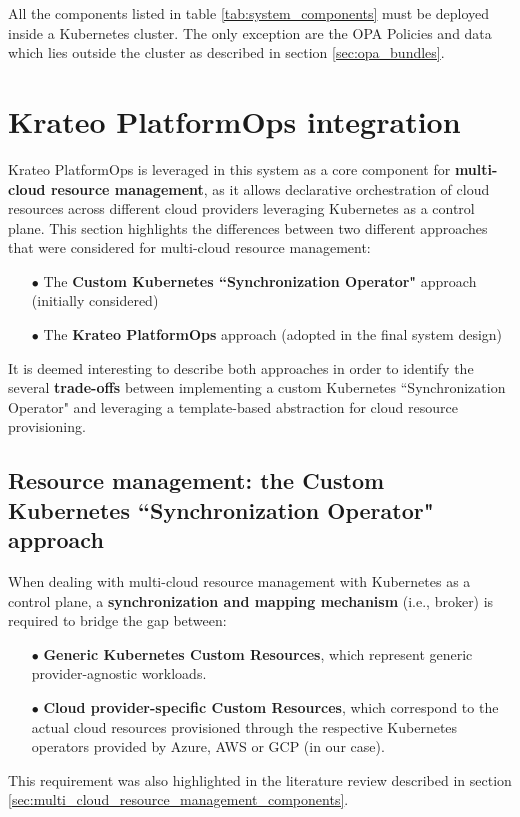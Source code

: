 All the components listed in table \ref{tab:system_components} must be deployed inside a Kubernetes cluster. The only exception are the OPA Policies and data which lies outside the cluster as described in section \ref{sec:opa_bundles}.

\section{Krateo PlatformOps integration}
\label{sec:krateo_integration}

Krateo PlatformOps is leveraged in this system as a core component for \textbf{multi-cloud resource management}, as it allows declarative orchestration of cloud resources across different cloud providers leveraging Kubernetes as a control plane. 
This section highlights the differences between two different approaches that were considered for multi-cloud resource management:
\begin{itemize}[itemsep=0.2pt, topsep=1pt]
  \item[$\bullet$] The \textbf{Custom Kubernetes ``Synchronization Operator"} approach (initially considered)
  \item[$\bullet$] The \textbf{Krateo PlatformOps} approach (adopted in the final system design) \\
\end{itemize}

It is deemed interesting to describe both approaches in order to identify the several \textbf{trade-offs} between implementing a custom Kubernetes ``Synchronization Operator" and leveraging a template-based abstraction for cloud resource provisioning.

\subsection{Resource management: the Custom Kubernetes ``Synchronization Operator" approach}

When dealing with multi-cloud resource management with Kubernetes as a control plane, a \textbf{synchronization and mapping mechanism} (i.e., broker) is required to bridge the gap between:
\begin{itemize}[itemsep=0.2pt, topsep=1pt]
  \item[$\bullet$] \textbf{Generic Kubernetes Custom Resources}, which represent generic provider-agnostic workloads.
  \item[$\bullet$] \textbf{Cloud provider-specific Custom Resources}, which correspond to the actual cloud resources provisioned through the respective Kubernetes operators provided by Azure, AWS or GCP (in our case).
\end{itemize}
This requirement was also highlighted in the literature review described in section \ref{sec:multi_cloud_resource_management_components}.

